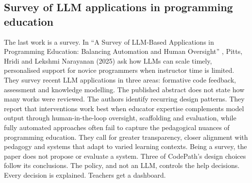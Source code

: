 \clearpage
\subsection{Survey of LLM applications in programming education}
The last work is a survey. In ``A Survey of LLM-Based Applications in Programming Education: Balancing Automation and Human Oversight'' \cite{pitts2025}, Pitts, Hridi and Lekshmi Narayanan (2025) ask how LLMs can scale timely, personalised support for novice programmers when instructor time is limited. They survey recent LLM applications in three areas: formative code feedback, assessment and knowledge modelling. The published abstract does not state how many works were reviewed. The authors identify recurring design patterns. They report that interventions work best when educator expertise complements model output through human-in-the-loop oversight, scaffolding and evaluation, while fully automated approaches often fail to capture the pedagogical nuances of programming education. They call for greater transparency, closer alignment with pedagogy and systems that adapt to varied learning contexts. Being a survey, the paper does not propose or evaluate a system. Three of CodePath's design choices follow its conclusions. The policy, and not an LLM, controls the help decisions. Every decision is explained. Teachers get a dashboard.

